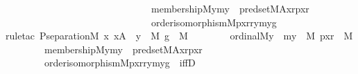 \begin{isabellebody}
\ \ \ \ \ \ \ \ \ \ \ \ \ \ \ \ \ \ \ \ \ \ \ \ \ \ \ \ \ \ membership{\isacharparenleft}{\kern0pt}{\isacharhash}{\kern0pt}{\isacharhash}{\kern0pt}M{\isacharcomma}{\kern0pt}y{\isacharcomma}{\kern0pt}my{\isacharparenright}{\kern0pt}\ {\isasymand}\ pred{\isacharunderscore}{\kern0pt}set{\isacharparenleft}{\kern0pt}{\isacharhash}{\kern0pt}{\isacharhash}{\kern0pt}M{\isacharcomma}{\kern0pt}A{\isacharcomma}{\kern0pt}x{\isacharcomma}{\kern0pt}r{\isacharcomma}{\kern0pt}pxr{\isacharparenright}{\kern0pt}\ {\isasymand}\isanewline
\ \ \ \ \ \ \ \ \ \ \ \ \ \ \ \ \ \ \ \ \ \ \ \ \ \ \ \ \ \ order{\isacharunderscore}{\kern0pt}isomorphism{\isacharparenleft}{\kern0pt}{\isacharhash}{\kern0pt}{\isacharhash}{\kern0pt}M{\isacharcomma}{\kern0pt}pxr{\isacharcomma}{\kern0pt}r{\isacharcomma}{\kern0pt}y{\isacharcomma}{\kern0pt}my{\isacharcomma}{\kern0pt}g{\isacharparenright}{\kern0pt}{\isacharparenright}{\kern0pt}{\isacharparenright}{\kern0pt}{\isacharparenright}{\kern0pt}{\isachardoublequoteclose}\isanewline
%
\isadelimproof
\isanewline
\ \ %
\endisadelimproof
%
\isatagproof
{}\isamarkupfalse%
{\isacharparenleft}{\kern0pt}rule{\isacharunderscore}{\kern0pt}tac\ P{\isacharequal}{\kern0pt}{\isachardoublequoteopen}separation{\isacharparenleft}{\kern0pt}{\isacharhash}{\kern0pt}{\isacharhash}{\kern0pt}M{\isacharcomma}{\kern0pt}\ {\isasymlambda}x{\isachardot}{\kern0pt}\ {\isacharparenleft}{\kern0pt}x{\isasymin}A\ {\isasymlongrightarrow}\ {\isasymnot}{\isacharparenleft}{\kern0pt}{\isasymexists}y\ {\isasymin}\ M{\isachardot}{\kern0pt}\ {\isasymexists}g\ {\isasymin}\ M{\isachardot}{\kern0pt}\isanewline
\ \ \ \ \ \ \ \ ordinal{\isacharparenleft}{\kern0pt}{\isacharhash}{\kern0pt}{\isacharhash}{\kern0pt}M{\isacharcomma}{\kern0pt}y{\isacharparenright}{\kern0pt}\ {\isasymand}\ {\isacharparenleft}{\kern0pt}{\isasymexists}my\ {\isasymin}\ M{\isachardot}{\kern0pt}\ {\isasymexists}pxr\ {\isasymin}\ M{\isachardot}{\kern0pt}\isanewline
\ \ \ \ \ \ \ \ membership{\isacharparenleft}{\kern0pt}{\isacharhash}{\kern0pt}{\isacharhash}{\kern0pt}M{\isacharcomma}{\kern0pt}y{\isacharcomma}{\kern0pt}my{\isacharparenright}{\kern0pt}\ {\isasymand}\ pred{\isacharunderscore}{\kern0pt}set{\isacharparenleft}{\kern0pt}{\isacharhash}{\kern0pt}{\isacharhash}{\kern0pt}M{\isacharcomma}{\kern0pt}A{\isacharcomma}{\kern0pt}x{\isacharcomma}{\kern0pt}r{\isacharcomma}{\kern0pt}pxr{\isacharparenright}{\kern0pt}\ {\isasymand}\isanewline
\ \ \ \ \ \ \ \ order{\isacharunderscore}{\kern0pt}isomorphism{\isacharparenleft}{\kern0pt}{\isacharhash}{\kern0pt}{\isacharhash}{\kern0pt}M{\isacharcomma}{\kern0pt}pxr{\isacharcomma}{\kern0pt}r{\isacharcomma}{\kern0pt}y{\isacharcomma}{\kern0pt}my{\isacharcomma}{\kern0pt}g{\isacharparenright}{\kern0pt}{\isacharparenright}{\kern0pt}{\isacharparenright}{\kern0pt}{\isacharparenright}{\kern0pt}{\isacharparenright}{\kern0pt}{\isachardoublequoteclose}\ \ iffD{}{\isacharparenright}{\kern0pt}\isanewline

\end{isabellebody}
